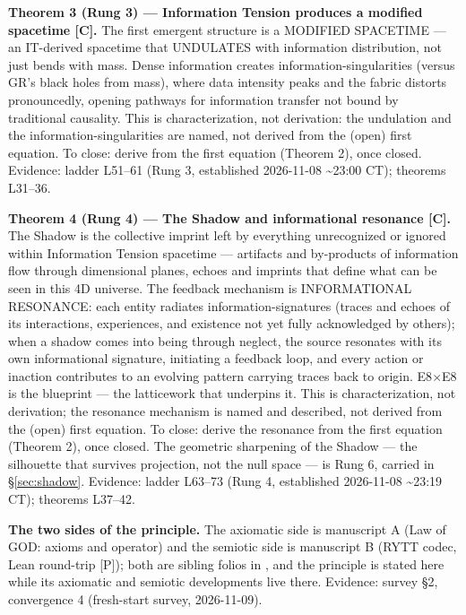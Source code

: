 \documentclass{alienfolio}
\begin{document}
\noindent\textbf{Theorem 3 (Rung 3) --- Information Tension produces a modified spacetime [C].} The first emergent structure is a MODIFIED SPACETIME --- an IT-derived spacetime that UNDULATES with information distribution, not just bends with mass. Dense information creates information-singularities (versus GR's black holes from mass), where data intensity peaks and the fabric distorts pronouncedly, opening pathways for information transfer not bound by traditional causality. This is characterization, not derivation: the undulation and the information-singularities are named, not derived from the (open) first equation. To close: derive from the first equation (Theorem 2), once closed. Evidence: ladder L51--61 (Rung 3, established 2026-11-08 \textasciitilde23:00 CT); theorems L31--36.

\noindent\textbf{Theorem 4 (Rung 4) --- The Shadow and informational resonance [C].} The Shadow is the collective imprint left by everything unrecognized or ignored within Information Tension spacetime --- artifacts and by-products of information flow through dimensional planes, echoes and imprints that define what can be seen in this 4D universe. The feedback mechanism is INFORMATIONAL RESONANCE: each entity radiates information-signatures (traces and echoes of its interactions, experiences, and existence not yet fully acknowledged by others); when a shadow comes into being through neglect, the source resonates with its own informational signature, initiating a feedback loop, and every action or inaction contributes to an evolving pattern carrying traces back to origin. E8$\times$E8 is the blueprint --- the latticework that underpins it. This is characterization, not derivation; the resonance mechanism is named and described, not derived from the (open) first equation. To close: derive the resonance from the first equation (Theorem 2), once closed. The geometric sharpening of the Shadow --- the silhouette that survives projection, not the null space --- is Rung 6, carried in \S\ref{sec:shadow}. Evidence: ladder L63--73 (Rung 4, established 2026-11-08 \textasciitilde23:19 CT); theorems L37--42.

\noindent\textbf{The two sides of the principle.} The axiomatic side is manuscript A (Law of GOD: axioms and operator) and the semiotic side is manuscript B (RYTT codec, Lean round-trip [P]); both are sibling folios in , and the principle is stated here while its axiomatic and semiotic developments live there. Evidence: survey \S2, convergence 4 (fresh-start survey, 2026-11-09).
\end{document}
